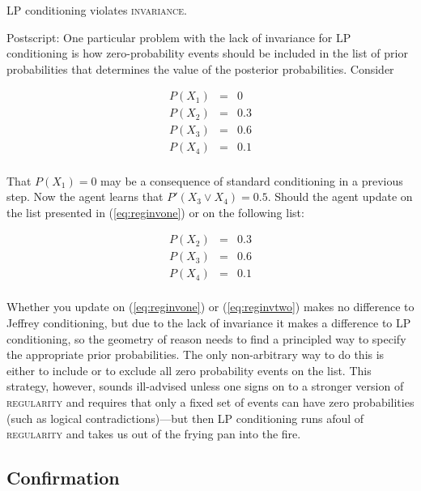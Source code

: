 \documentclass[11pt]{article}
\begin{document}
LP conditioning violates \textsc{invariance}.

Postscript: One particular problem with the lack of invariance for LP
conditioning is how zero-probability events should be included in the
list of prior probabilities that determines the value of the posterior
probabilities. Consider

\begin{equation}
  \label{eq:reginvone}
  \begin{array}{rcl}
  P(X_{1})&=&0\\
  P(X_{2})&=&0.3\\
  P(X_{3})&=&0.6\\
  P(X_{4})&=&0.1\\
\end{array}
\end{equation}

That $P(X_{1})=0$ may be a consequence of standard conditioning in a
previous step. Now the agent learns that $P'(X_{3}\vee{}X_{4})=0.5$.
Should the agent update on the list presented in (\ref{eq:reginvone})
or on the following list:

\begin{equation}
  \label{eq:reginvtwo}
  \begin{array}{rcl}
  P(X_{2})&=&0.3\\
  P(X_{3})&=&0.6\\
  P(X_{4})&=&0.1\\
\end{array}
\end{equation}

Whether you update on (\ref{eq:reginvone}) or (\ref{eq:reginvtwo})
makes no difference to Jeffrey conditioning, but due to the lack of
invariance it makes a difference to LP conditioning, so the geometry
of reason needs to find a principled way to specify the appropriate
prior probabilities. The only non-arbitrary way to do this is either
to include or to exclude all zero probability events on the list. This
strategy, however, sounds ill-advised unless one signs on to a
stronger version of \textsc{regularity} and requires that only a fixed
set of events can have zero probabilities (such as logical
contradictions)---but then LP conditioning runs afoul of
\textsc{regularity} and takes us out of the frying pan into the fire.

\subsection{Confirmation}
\label{Confirmation}
\end{document}
